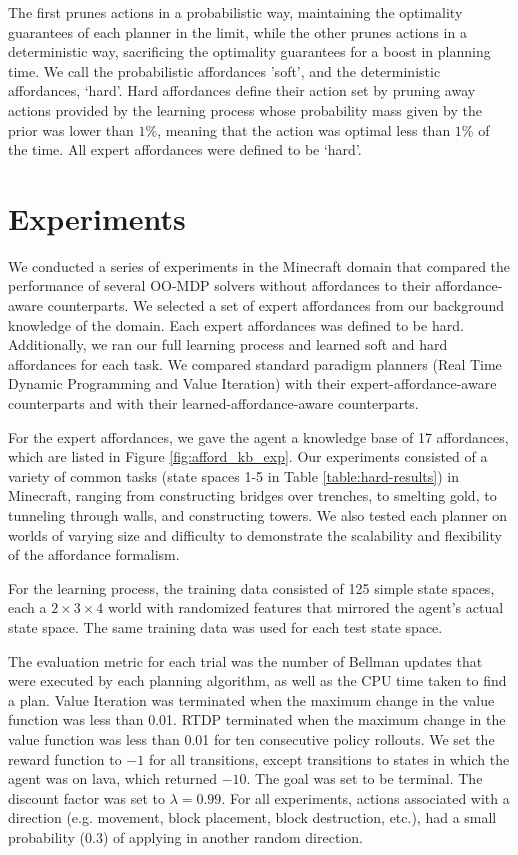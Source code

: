 \documentclass[conference]{IEEEtran}
\begin{document}
The first prunes actions in a probabilistic way, maintaining the optimality guarantees of
each planner in the limit, while the other prunes actions in a deterministic way, sacrificing the optimality guarantees for
a boost in planning time. We call the probabilistic affordances 'soft', and the deterministic affordances, `hard'. Hard affordances
define their action set by pruning away actions provided by the learning process whose probability mass given by the prior was lower than
$1\%$, meaning that the action was optimal less than $1\%$ of the time. All expert affordances were defined to be `hard'.

\section{Experiments}
\label{sec:experiments}

We conducted a series of experiments in the Minecraft domain that
compared the performance of several OO-MDP solvers without affordances
to their affordance-aware counterparts. We selected a set of expert
affordances from our background knowledge of the domain. Each expert affordances was
defined to be hard. Additionally, we ran our full learning process and learned soft and hard affordances
for each task. We compared standard paradigm planners (Real Time Dynamic Programming and Value Iteration)
with their expert-affordance-aware counterparts and with their learned-affordance-aware counterparts.

For the expert affordances, we gave the agent a knowledge base of 17 affordances,
which are listed in Figure \ref{fig:afford_kb_exp}.  Our experiments
consisted of a variety of common tasks (state spaces 1-5 in Table \ref{table:hard-results}) in Minecraft, ranging from
constructing bridges over trenches, to smelting gold, to tunneling
through walls, and constructing towers.  We also tested each planner on worlds of varying size
and difficulty to demonstrate the scalability and flexibility of the
affordance formalism.

For the learning process, the training data consisted of 125 simple state
spaces, each a $2\times3\times4$ world with randomized features that mirrored the agent's actual state space. The same training data was used
for each test state space.

The evaluation metric for each trial was the
number of Bellman updates that were executed by each planning
algorithm, as well as the CPU time taken to find a plan. Value Iteration was terminated when the maximum change in
the value function was less than 0.01. RTDP terminated when the
maximum change in the value function was less than 0.01 for ten
consecutive policy rollouts. We set the reward function to $-1$ for all transitions, except
transitions to states in which the agent was on lava, which returned 
$-10$. The goal was set to be terminal. The discount
factor was set to $\lambda = 0.99$. For all experiments, actions associated with
a direction (e.g. movement, block placement, block destruction, etc.), had a small 
probability ($0.3$) of applying in another random direction.
\end{document}
